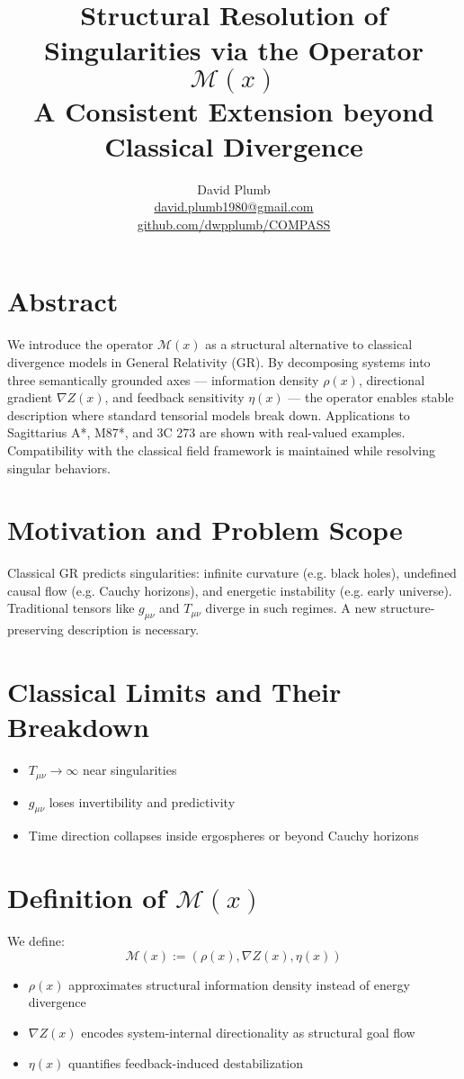 \documentclass[11pt]{article}
\title{Structural Resolution of Singularities via the Operator $\mathcal{M}(x)$ \\[1ex]
\large A Consistent Extension beyond Classical Divergence}
\author{David Plumb\\ \href{mailto:david.plumb1980@gmail.com}{david.plumb1980@gmail.com} \\ \href{https://github.com/dwpplumb/COMPASS}{github.com/dwpplumb/COMPASS}}
\date{}
\begin{document}
\maketitle

\section*{Abstract}
We introduce the operator $\mathcal{M}(x)$ as a structural alternative to classical divergence models in General Relativity (GR). By decomposing systems into three semantically grounded axes — information density $\rho(x)$, directional gradient $\nabla Z(x)$, and feedback sensitivity $\eta(x)$ — the operator enables stable description where standard tensorial models break down. Applications to Sagittarius A*, M87*, and 3C 273 are shown with real-valued examples. Compatibility with the classical field framework is maintained while resolving singular behaviors.

\section{Motivation and Problem Scope}
Classical GR predicts singularities: infinite curvature (e.g. black holes), undefined causal flow (e.g. Cauchy horizons), and energetic instability (e.g. early universe). Traditional tensors like $g_{\mu\nu}$ and $T_{\mu\nu}$ diverge in such regimes. A new structure-preserving description is necessary.

\section{Classical Limits and Their Breakdown}
\begin{itemize}
  \item $T_{\mu\nu} \to \infty$ near singularities
  \item $g_{\mu\nu}$ loses invertibility and predictivity
  \item Time direction collapses inside ergospheres or beyond Cauchy horizons
\end{itemize}

\section{Definition of $\mathcal{M}(x)$}
We define:
\[
\mathcal{M}(x) := \left( \rho(x), \nabla Z(x), \eta(x) \right)
\]
\begin{itemize}
  \item $\rho(x)$ approximates structural information density instead of energy divergence
  \item $\nabla Z(x)$ encodes system-internal directionality as structural goal flow
  \item $\eta(x)$ quantifies feedback-induced destabilization
\end{itemize}
\end{document}
